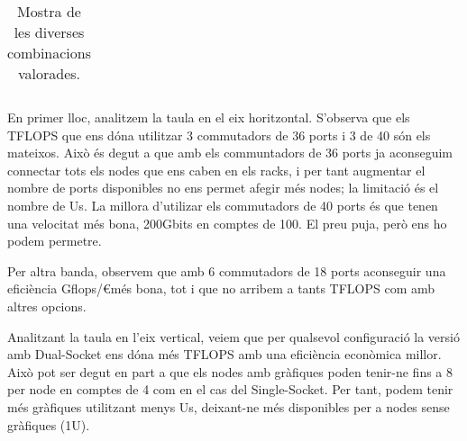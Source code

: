 \begin{table}[H]
\begin{adjustwidth}{-1.0in}{-1.0in}
\begin{center}
\begin{tabular}{ll|c|c|c|c}
\end{tabular}
\caption{Mostra de les diverses combinacions valorades.}
\end{center}
\end{adjustwidth}
\end{table}

En primer lloc, analitzem la taula en el eix horitzontal. S'observa que els TFLOPS que ens dóna utilitzar 3 commutadors de 36 ports i 3 de 40 són els mateixos. Això és degut a que amb els communtadors de 36 ports ja aconseguim connectar tots els nodes que ens caben en els racks, i per tant augmentar el nombre de ports disponibles no ens permet afegir més nodes; la limitació és el nombre de Us. La millora d'utilizar els commutadors de 40 ports és que tenen una velocitat més bona, 200Gbits en comptes de 100. El preu puja, però ens ho podem permetre.

Per altra banda, observem que amb 6 commutadors de 18 ports aconseguir una eficiència Gflops/\euro  més bona, tot i que no arribem a tants TFLOPS com amb altres opcions.

Analitzant la taula en l'eix vertical, veiem que per qualsevol configuració la versió amb Dual-Socket ens dóna més TFLOPS amb una eficiència econòmica millor. Això pot ser degut en part a que els nodes amb gràfiques poden tenir-ne fins a 8 per node en comptes de 4 com en el cas del Single-Socket. Per tant, podem tenir més gràfiques utilitzant menys Us, deixant-ne més disponibles per a nodes sense gràfiques (1U).


